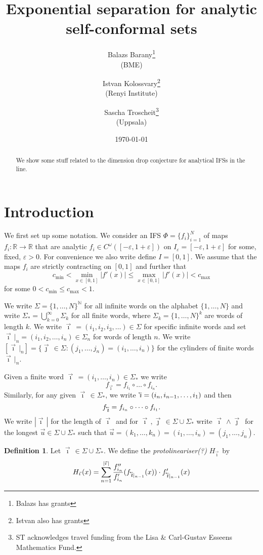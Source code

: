 \documentclass[12pt,]{article}
\title{Exponential separation for analytic self-conformal sets}
\author{Balazs Barany\footnote{Balazs has grants}\\(BME) \and Istvan Kolossvary\footnote{Istvan also
  has grants}\\ (Renyi Institute) \and Sascha
Troscheit\footnote{ST acknowledges travel funding from the Lisa \& Carl-Gustav Esseens Mathematics
Fund.} \\(Uppsala)}
\date{\today}
\theoremstyle{definition}
\newtheorem{definition}[theorem]{Definition}
\theoremstyle{remark}
\renewcommand{\Bbb}[1]{\mathbb{#1}}
\newcommand{\bbN}{{\Bbb N}}         %
\newcommand{\bbR}{{\Bbb R}}        %
\newcommand{\0}{\mathbf{0}}
\newcommand{\eps}{\varepsilon}
\newcommand{\cev}[1]{\reflectbox{\ensuremath{\vec{\reflectbox{\ensuremath{#1}}}}}}
\newcommand{\bi}{\vec{\imath}\,}
\newcommand{\bj}{\vec{\jmath}\,}
\newcommand{\bu}{{\vec{u}}}
\newcommand{\bbi}{\,\cev{\imath}}
\begin{document}
\frenchspacing
\maketitle

\begin{abstract}
  We show some stuff related to the dimension drop conjecture for analytical IFSs in the line.
\end{abstract}



%
%


\section{Introduction} \label{sec:intro}
We first set up some notation. We consider an IFS $\Phi=\{f_i\}_{i=1}^N$ of maps $f_i:\bbR\to\bbR$
that are analytic $f_i \in C^\omega([-\eps,1+\eps])$ on $I_{\eps}=[-\eps,1+\eps]$ for some, fixed, $\eps>0$.
For convenience we also write define $I=[0,1]$.
We assume that the maps $f_i$ are strictly contracting on $[0,1]$ and further that 
\[
  c_{\min} < \min_{x\in[0,1]}
  |f'(x)| \leq \max_{x\in[0,1]}|f'(x)| < c_{\max} 
\]
for some $0<c_{\min} \leq c_{\max}<1$.

We write $\Sigma = \{1,\dots, N\}^{\bbN}$ for all infinite words on the alphabet $\{1,\dots,N\}$ and
write $\Sigma_* = \bigcup_{k=0}^\infty \Sigma_k$ for all finite words, where $\Sigma_k =
\{1,\dots,N\}^k$ are words of length $k$.
We write $\bi=(i_1,i_2,i_3,\dots) \in\Sigma$ for specific infinite words and set $\bi|_n =
(i_1,i_2,\dots,i_n)\in \Sigma_n$ for words of length $n$. We write $[\bi|_n] = \{\bj\in\Sigma :
(j_1,\dots,j_n) = (i_1,\dots, i_n)\}$ for the cylinders of finite words $\bi|_n$. 

Given a finite word $\bi=(i_1,\dots,i_n)\in\Sigma_*$ we write
\[
  f_{\bi} = f_{i_1}\circ \dots \circ f_{i_n}.
\]
Similarly, for any given $\bi\in\Sigma_*$, we write $\bbi = (i_n,i_{n-1},\dots, i_1)$ and then
\[
  f_{\bbi} = f_{i_n}\circ \dots \circ f_{i_1}.
\]
We write $|\bi|$ for the length of $\bi$ and for $\bi,\bj\in\Sigma\cup\Sigma_*$ write $\bi\wedge\bj$
for the longest $\bu\in\Sigma\cup\Sigma_*$ such that $\bu=(k_1,\dots, k_n) = (i_1,\dots,
i_n)=(j_1,\dots,j_n)$.

\begin{definition}
  Let $\bi\in \Sigma\cup\Sigma_*$. We define the \emph{protolineariser(?)} $H_{\bi}$ by
  \[
    H_{\bi}(x) = \sum_{n=1}^{|\bi|}
  \frac{f''_{i_n}}{f'_{i_n}}(f_{\bbi|_{n-1}}(x))\cdot f'_{\bbi|_{n-1}}(x)
  \]
\end{definition}
\end{document}
